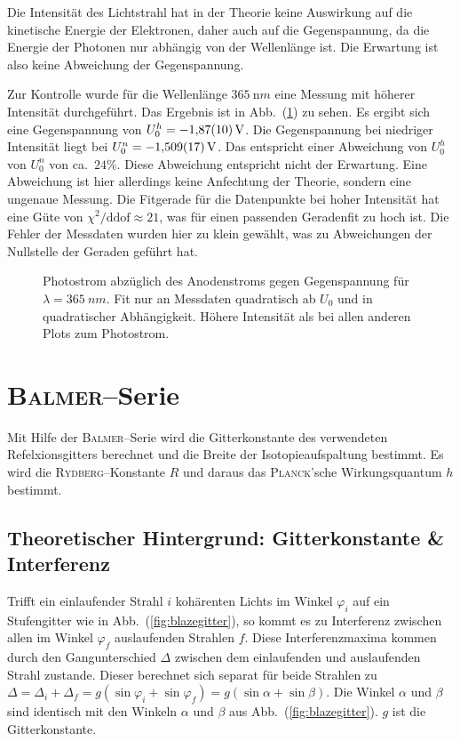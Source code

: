 \documentclass[sn-mathphys-num,iicol]{sn-jnl}
\theoremstyle{thmstyleone}
\theoremstyle{thmstyletwo}
\theoremstyle{thmstylethree}
\begin{document}
Die Intensität des Lichtstrahl hat in der Theorie keine Auswirkung auf die kinetische Energie der Elektronen, daher auch auf die Gegenspannung, da die Energie der Photonen nur abhängig von der Wellenlänge ist.
Die Erwartung ist also keine Abweichung der Gegenspannung.

Zur Kontrolle wurde für die Wellenlänge $\SI{365}{\nano m}$ eine Messung mit höherer Intensität durchgeführt.
Das Ergebnis ist in Abb.\ (\ref{fig:photostrom_hohe_intensität}) zu sehen.
Es ergibt sich eine Gegenspannung von $U_0^h=-\SI{1.87+-.1}{V}$.
Die Gegenspannung bei niedriger Intensität liegt bei $U_0^n=\SI{-1.509+-.017}{V}$.
Das entspricht einer Abweichung von $U_0^h$ von $U_0^n$ von ca.\ $24\%$.
Diese Abweichung entspricht nicht der Erwartung.
Eine Abweichung ist hier allerdings keine Anfechtung der Theorie, sondern eine ungenaue Messung.
Die Fitgerade für die Datenpunkte bei hoher Intensität hat eine Güte von $\chi ^2/\text{ddof}\approx 21$, was für einen passenden Geradenfit zu hoch ist.
Die Fehler der Messdaten wurden hier zu klein gewählt, was zu Abweichungen der Nullstelle der Geraden geführt hat.

\begin{figure}[t]
        \centering
        \resizebox{.5\textwidth}{!}{}
        \caption{Photostrom abzüglich des Anodenstroms gegen Gegenspannung für $\lambda =\SI{365}{n m}$. Fit nur an Messdaten quadratisch ab $U_0$ und in quadratischer Abhängigkeit. Höhere Intensität als bei allen anderen Plots zum Photostrom.} \label{fig:photostrom_hohe_intensität}
\end{figure}

\section{\textsc{Balmer}--Serie}
Mit Hilfe der \textsc{Balmer}--Serie wird die Gitterkonstante des verwendeten Refelxionsgitters berechnet und die Breite der Isotopieaufspaltung bestimmt.
Es wird die \textsc{Rydberg}--Konstante $R$ und daraus das \textsc{Planck}'sche Wirkungsquantum $h$ bestimmt.

\subsection{Theoretischer Hintergrund: Gitterkonstante \& Interferenz}
Trifft ein einlaufender Strahl $i$ kohärenten Lichts im Winkel $\varphi _i$ auf ein Stufengitter wie in Abb.\ (\ref{fig:blazegitter}), so kommt es zu Interferenz zwischen allen im Winkel $\varphi _f$ auslaufenden Strahlen $f$.
Diese Interferenzmaxima kommen durch den Gangunterschied $\Delta $ zwischen dem einlaufenden und auslaufenden Strahl zustande.
Dieser berechnet sich separat für beide Strahlen zu $\Delta =\Delta _i+\Delta _f=g\left(\sin \varphi _i+\sin \varphi _f\right)=g\left(\sin \alpha +\sin \beta \right)$.
Die Winkel $\alpha $ und $\beta $ sind identisch mit den Winkeln $\alpha $ und $\beta $ aus Abb.\ (\ref{fig:blazegitter}).
$g$ ist die Gitterkonstante.
\end{document}
